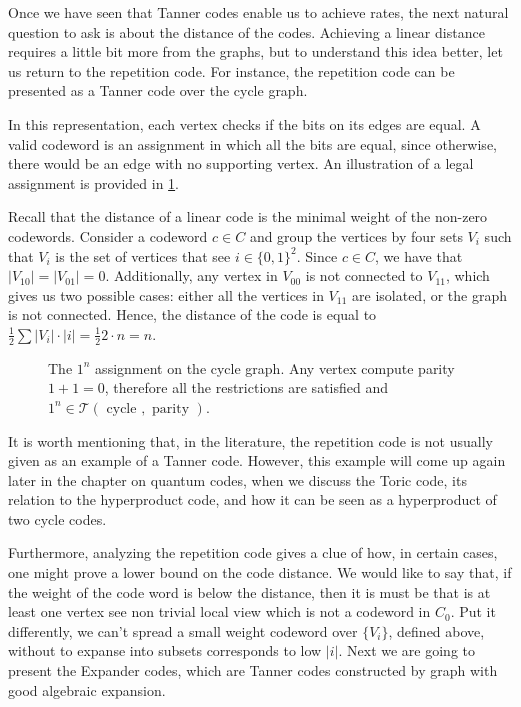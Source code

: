   Once we have seen that Tanner codes enable us to achieve rates, the next natural question to ask is about the distance of the codes. Achieving a linear distance requires a little bit more from the graphs, but to understand this idea better, let us return to the repetition code. For instance, the repetition code can be presented as a Tanner code over the cycle graph.  

  \begin{example}
    In this representation, each vertex checks if the bits on its edges are equal. A valid codeword is an assignment in which all the bits are equal, since otherwise, there would be an edge with no supporting vertex. An illustration of a legal assignment is provided in \cref{fig:cyc}.
    

Recall that the distance of a linear code is the minimal weight of the non-zero codewords. Consider a codeword $c \in C$ and group the vertices by four sets $V_i$ such that $V_i$ is the set of vertices that see $i \in \{0,1\}^{2}$. Since $c \in C$, we have that $|V_{10}|=|V_{01}| = 0$. Additionally, any vertex in $V_{00}$ is not connected to $V_{11}$, which gives us two possible cases: either all the vertices in $V_{11}$ are isolated, or the graph is not connected. Hence, the distance of the code is equal to $\frac{1}{2}\sum{|V_{i}|\cdot |i|} = \frac{1}{2}2 \cdot n = n$.
  \end{example} 


 \begin{figure}[h]
  \label{fig:cyc}
 
\caption{The $1^{n}$ assignment on the cycle graph. Any vertex compute parity $1 + 1 = 0$, therefore all the restrictions are satisfied and $1^n \in \mathcal{T} \left( \text{ cycle } , \text{ parity }  \right) $.}
\end{figure}

It is worth mentioning that, in the literature, the repetition code is not usually given as an example of a Tanner code. However, this example will come up again later in the chapter on quantum codes, when we discuss the Toric code, its relation to the hyperproduct code, and how it can be seen as a hyperproduct of two cycle codes.

Furthermore, analyzing the repetition code gives a clue of how, in certain cases, one might prove a lower bound on the code distance. We would like to say that, if the weight of the code word is below the distance, then it is must be that is at least one vertex see non trivial local view which is not a codeword in $C_{0}$. Put it differently, we can't spread a small weight codeword over $\{V_{i}\}$, defined above, without to expanse into subsets corresponds to low $|i|$. Next we are going to present the Expander codes, which are Tanner codes constructed by graph with good algebraic expansion.   

